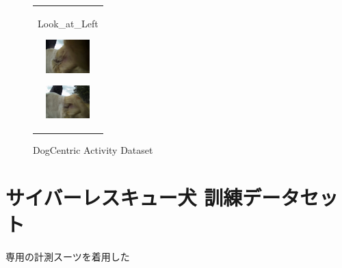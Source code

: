 \begin{figure}[htbp]
\begin{tabular}{c}
\begin{minipage}{0.18\hsize}
\begin{center}
       \hspace{0.1cm} {Look\_at\_Left}
      \end{center}
     \end{minipage}
     \begin{minipage}{0.18\hsize}
      \begin{center}
       \includegraphics[clip, width=1.7cm]{./Figures/KL004.eps}
       \hspace{1.3cm} { }
      \end{center}
     \end{minipage}
     \begin{minipage}{0.18\hsize}
      \begin{center}
       \includegraphics[clip, width=1.7cm]{./Figures/KL005.eps}
       \hspace{1.6cm} { }
      \end{center}
     \end{minipage}

    \end{tabular}
    \caption{DogCentric Activity Dataset}
    \label{DCAD_img}
\end{figure}
\section{サイバーレスキュー犬 訓練データセット}
専用の計測スーツを着用した
